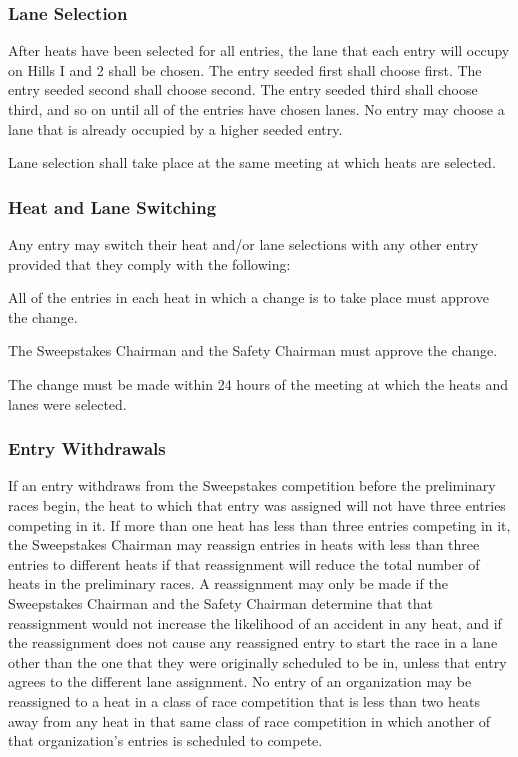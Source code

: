 \documentclass[openany]{book}
\begin{document}
\subsubsection{Lane Selection}

After heats have been selected for all entries, the lane that each entry will occupy on Hills I and 2 shall be chosen. The entry seeded first shall choose first. The entry seeded second shall choose second. The entry seeded third shall choose third, and so on until all of the entries have chosen lanes. No entry may choose a lane that is already occupied by a higher seeded entry.

Lane selection shall take place at the same meeting at which heats are selected.

\subsubsection{Heat and Lane Switching}

Any entry may switch their heat and/or lane selections with any other entry provided that they comply with the following:

All of the entries in each heat in which a change is to take place must approve the change.

The Sweepstakes Chairman and the Safety Chairman must approve the change.

The change must be made within 24 hours of the meeting at which the heats and lanes were selected.

\subsubsection{Entry Withdrawals}

If an entry withdraws from the Sweepstakes competition before the preliminary races begin, the heat to which that entry was assigned will not have three entries competing in it. If more than one heat has less than three entries competing in it, the Sweepstakes Chairman may reassign entries in heats with less than three entries to different heats if that reassignment will reduce the total number of heats in the preliminary races. A reassignment may only be made if the Sweepstakes Chairman and the Safety Chairman determine that that reassignment would not increase the likelihood of an accident in any heat, and if the reassignment does not cause any reassigned entry to start the race in a lane other than the one that they were originally scheduled to be in, unless that entry agrees to the different lane assignment. No entry of an organization may be reassigned to a heat in a class of race competition that is less than two heats away from any heat in that same class of race competition in which another of that organization's entries is scheduled to compete.
\end{document}
